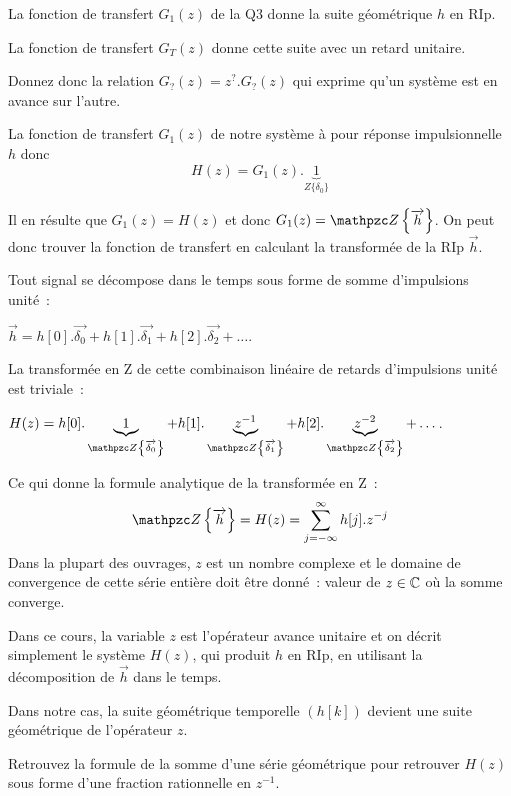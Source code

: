 La fonction de transfert $G_1(z)$ de la Q3 donne la suite géométrique $h$ en RIp.

La fonction de transfert $G_T(z)$ donne cette suite avec un retard unitaire.

Donnez donc la relation $G_?(z) = z^{?}.G_?(z)$ qui exprime qu'un système est en avance sur l'autre.




La fonction de transfert $G_1(z)$ de notre système à pour réponse
impulsionnelle $h$ donc
$$H(z) = G_1(z).\underbrace{1}_{Z\{\delta_0\}}$$

Il en résulte que $G_1(z)=H(z)$ et donc $G_1(z)=\tZde{\vec{h}}$. On
peut donc trouver la fonction de transfert en calculant la transformée
de la RIp $\vec{h}$.

\begin{remarque}
  Tout signal se décompose dans le temps sous forme de somme d'impulsions unité~:

  $\vec{h}= h[0].\vec{\delta_0} + h[1].\vec{\delta_1} + h[2].\vec{\delta_2} + \dots$.

La transformée en Z de cette combinaison linéaire de retards d'impulsions unité est triviale~:  

$H(z)= h[0].\underbrace{1}_{\tZde{\vec{\delta_0}}} + h[1].\underbrace{\zmu}_{\tZde{\vec{\delta_1}}} + h[2].\underbrace{z^{-2}}_{\tZde{\vec{\delta_2}}} + \dots$.

Ce qui donne la formule analytique de la transformée en Z~:
$$\tZde{\vec{h}} = H(z) = \sum\limits_{j=-\infty}^{\infty} h[j] . z^{-j}$$
Dans la plupart des ouvrages, $z$ est un nombre complexe et le domaine
de convergence de cette série entière doit être donné~: valeur de
$z\in\mathbb{C}$ où la somme converge.

Dans ce cours, la variable $z$ est l'opérateur avance unitaire et on décrit simplement le système $H(z)$, qui produit $h$ en RIp, en  utilisant la décomposition de $\vec{h}$ dans le temps.

\end{remarque}

Dans notre cas, la suite géométrique temporelle $\left(h[k]\right)$ devient une suite géométrique de l'opérateur $z$.

Retrouvez la formule de la somme d'une série géométrique pour
retrouver $H(z)$ sous forme d'une fraction rationnelle en $z^{-1}$.

